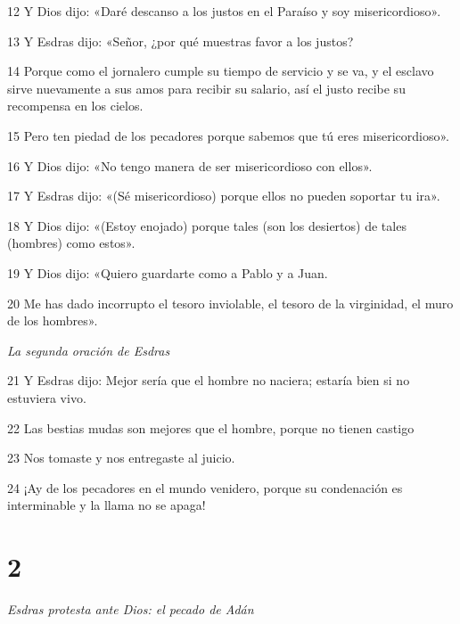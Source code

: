 \par 12 Y Dios dijo: «Daré descanso a los justos en el Paraíso y soy misericordioso».

\par 13 Y Esdras dijo: «Señor, ¿por qué muestras favor a los justos?

\par 14 Porque como el jornalero cumple su tiempo de servicio y se va, y el esclavo sirve nuevamente a sus amos para recibir su salario, así el justo recibe su recompensa en los cielos. 

\par 15 Pero ten piedad de los pecadores porque sabemos que tú eres misericordioso».

\par 16 Y Dios dijo: «No tengo manera de ser misericordioso con ellos». 

\par 17 Y Esdras dijo: «(Sé misericordioso) porque ellos no pueden soportar tu ira».

\par 18 Y Dios dijo: «(Estoy enojado) porque tales (son los desiertos) de tales (hombres) como estos».

\par 19 Y Dios dijo: «Quiero guardarte como a Pablo y a Juan.

\par 20 Me has dado incorrupto el tesoro inviolable, el tesoro de la virginidad, el muro de los hombres».

\par \textit{La segunda oración de Esdras}

\par 21 Y Esdras dijo: Mejor sería que el hombre no naciera; estaría bien si no estuviera vivo.

\par 22 Las bestias mudas son mejores que el hombre, porque no tienen castigo

\par 23 Nos tomaste y nos entregaste al juicio. 

\par 24 ¡Ay de los pecadores en el mundo venidero, porque su condenación es interminable y la llama no se apaga!

\chapter{2}

\par \textit{Esdras protesta ante Dios: el pecado de Adán}

